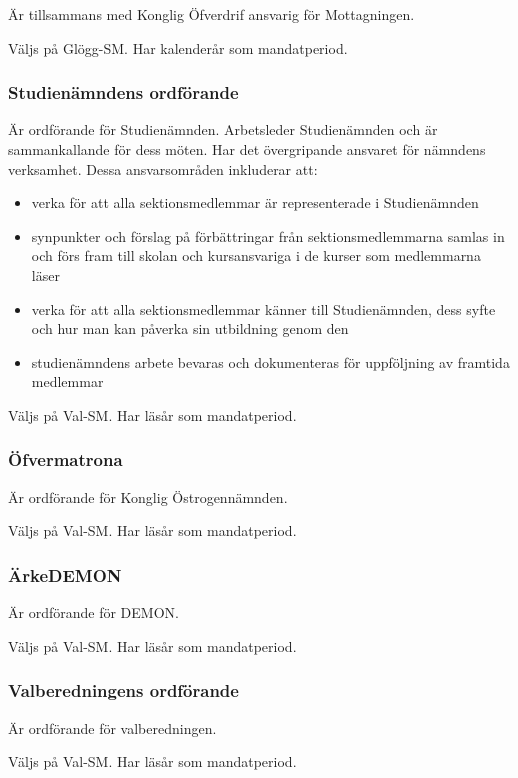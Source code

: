 \documentclass{dgovdoc}
\begin{document}
Är tillsammans med Konglig Öfverdrif ansvarig för Mottagningen.

Väljs på Glögg-SM. Har kalenderår som mandatperiod.

\subsubsection{Studienämndens ordförande}

Är ordförande för Studienämnden.
Arbetsleder Studienämnden och är sammankallande för dess möten. Har
det övergripande ansvaret för nämndens verksamhet. Dessa ansvarsområden inkluderar
att:
\begin{itemize}
	\item verka för att alla sektionsmedlemmar är representerade i Studienämnden
	\item synpunkter och förslag på förbättringar från sektionsmedlemmarna samlas in och förs fram till skolan och kursansvariga i de kurser som medlemmarna läser
	\item verka för att alla sektionsmedlemmar känner till Studienämnden, dess syfte och hur man kan påverka sin utbildning genom den
	\item studienämndens arbete bevaras och dokumenteras för uppföljning av framtida medlemmar
\end{itemize}

Väljs på Val-SM. Har läsår som mandatperiod.

\subsubsection{Öfvermatrona}

Är ordförande för Konglig Östrogennämnden.

Väljs på Val-SM. Har läsår som mandatperiod.

\subsubsection{ÄrkeDEMON}

Är ordförande för DEMON.

Väljs på Val-SM. Har läsår som mandatperiod.

\subsubsection{Valberedningens ordförande}

Är ordförande för valberedningen.

Väljs på Val-SM. Har läsår som mandatperiod.
\end{document}
